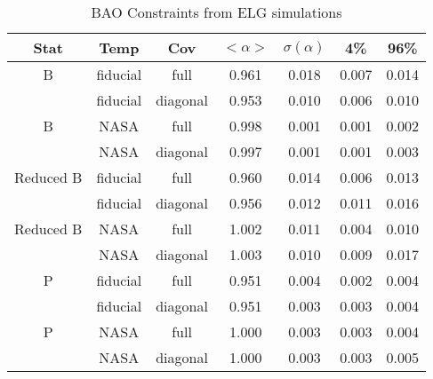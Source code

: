 \begin{table}
\caption{‌BAO Constraints from ELG simulations}
\begin{center}
\begin{tabular}{ccccccc}
Stat & Temp & Cov &$< \alpha >$ & $\sigma(\alpha) $ & 4\%&96\%\\
\hline
                            B  &   fiducial & full & 0.961 & 0.018& 0.007 & 0.014\\ 
 &   fiducial & diagonal & 0.953 & 0.010 &0.006 &0.010\\ 
\hline
                            B  &       NASA & full & 0.998 & 0.001& 0.001 & 0.002\\ 
 &       NASA & diagonal & 0.997 & 0.001 &0.001 &0.003\\ 
\hline
                    Reduced B  &   fiducial & full & 0.960 & 0.014& 0.006 & 0.013\\ 
 &   fiducial & diagonal & 0.956 & 0.012 &0.011 &0.016\\ 
\hline
                    Reduced B  &       NASA & full & 1.002 & 0.011& 0.004 & 0.010\\ 
 &       NASA & diagonal & 1.003 & 0.010 &0.009 &0.017\\ 
\hline
                            P  &   fiducial & full & 0.951 & 0.004& 0.002 & 0.004\\ 
 &   fiducial & diagonal & 0.951 & 0.003 &0.003 &0.004\\ 
\hline
                            P  &       NASA & full & 1.000 & 0.003& 0.003 & 0.004\\ 
 &       NASA & diagonal & 1.000 & 0.003 &0.003 &0.005
\end{tabular}
\end{center}
\label{label:elg}
\end{table}


